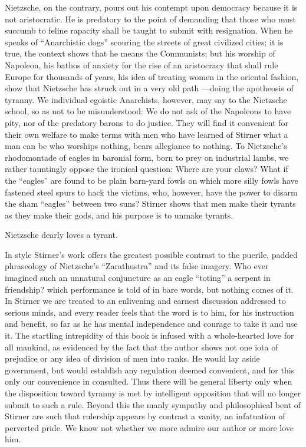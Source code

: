 Nietzsche, on the contrary, pours out his contempt upon democracy because it 
is not aristocratic. He is predatory to the point of demanding that those who 
must succumb to feline rapacity shall be taught to submit with resignation. 
When he speaks of ``Anarchistic dogs'' scouring the streets of great 
civilized cities; it is true, the context shows that he means the Communists; 
but his worship of Napoleon, his bathos of anxiety for the rise of an 
aristocracy that shall rule Europe for thousands of years, his idea of 
treating women in the oriental fashion, show that Nietzsche has struck out in 
a very old path ---doing the apotheosis of tyranny. We individual egoistic 
Anarchists, however, may say to the Nietzsche school, so as not to be 
misunderstood: We do not ask of the Napoleons to have pity, nor of the 
predatory barons to do justice. They will find it convenient for their own 
welfare to make terms with men who have learned of Stirner what a man can be 
who worships nothing, bears allegiance to nothing. To Nietzsche's rhodomontade 
of eagles in baronial form, born to prey on industrial lambs, we rather 
tauntingly oppose the ironical question: Where are your claws? What if the 
``eagles'' are found to be plain barn-yard fowls on which more silly fowls 
have fastened steel spurs to hack the victims, who, however, have the power to 
disarm the sham ``eagles'' between two suns? Stirner shows that men make 
their tyrants as they make their gods, and his purpose is to unmake tyrants.

Nietzsche dearly loves a tyrant.

In style Stirner's work offers the greatest possible contrast to the puerile, 
padded phraseology of Nietzsche's ``Zarathustra'' and its false imagery. Who 
ever imagined such an unnatural conjuncture as an eagle ``toting'' a serpent 
in friendship? which performance is told of in bare words, but nothing comes 
of it. In Stirner we are treated to an enlivening and earnest discussion 
addressed to serious minds, and every reader feels that the word is to him, 
for his instruction and benefit, so far as he has mental independence and 
courage to take it and use it. The startling intrepidity of this book is 
infused with a whole-hearted love for all mankind, as evidenced by the fact 
that the author shows not one iota of prejudice or any idea of division of men 
into ranks. He would lay aside government, but would establish any regulation 
deemed convenient, and for this only our convenience in consulted. Thus there 
will be general liberty only when the disposition toward tyranny is met by 
intelligent opposition that will no longer submit to such a rule. Beyond this 
the manly sympathy and philosophical bent of Stirner are such that rulership 
appears by contrast a vanity, an infatuation of perverted pride. We know not 
whether we more admire our author or more love him.


